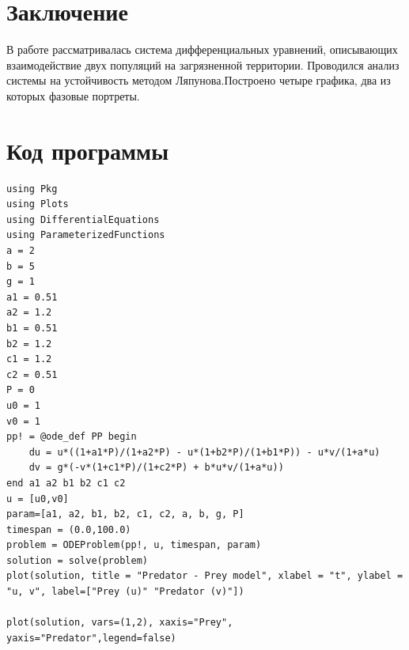 \documentclass[
  13pt,
  fontsize=13pt,
  russian,
  a4paper,
,captions=tableheading
]{scrreprt}
\begin{document}
\hypertarget{ux437ux430ux43aux43bux44eux447ux435ux43dux438ux435}{%
\chapter*{Заключение}\label{ux437ux430ux43aux43bux44eux447ux435ux43dux438ux435}}

В работе рассматривалась система дифференциальных уравнений, описывающих
взаимодействие двух популяций на загрязненной территории. Проводился
анализ системы на устойчивость методом Ляпунова.Построено четыре
графика, два из которых фазовые портреты.

\printbibliography[heading=bibintoc]

\appendix

\hypertarget{ux43aux43eux434-ux43fux440ux43eux433ux440ux430ux43cux43cux44b}{%
\chapter{Код
программы}\label{ux43aux43eux434-ux43fux440ux43eux433ux440ux430ux43cux43cux44b}}

\begin{verbatim}
using Pkg
using Plots
using DifferentialEquations
using ParameterizedFunctions
a = 2
b = 5
g = 1
a1 = 0.51
a2 = 1.2
b1 = 0.51
b2 = 1.2
c1 = 1.2
c2 = 0.51
P = 0
u0 = 1
v0 = 1
pp! = @ode_def PP begin
    du = u*((1+a1*P)/(1+a2*P) - u*(1+b2*P)/(1+b1*P)) - u*v/(1+a*u)
    dv = g*(-v*(1+c1*P)/(1+c2*P) + b*u*v/(1+a*u))
end a1 a2 b1 b2 c1 c2 
u = [u0,v0]
param=[a1, a2, b1, b2, c1, c2, a, b, g, P]
timespan = (0.0,100.0)
problem = ODEProblem(pp!, u, timespan, param)
solution = solve(problem)
plot(solution, title = "Predator - Prey model", xlabel = "t", ylabel = "u, v", label=["Prey (u)" "Predator (v)"])

plot(solution, vars=(1,2), xaxis="Prey", yaxis="Predator",legend=false)
\end{verbatim}
\end{document}
